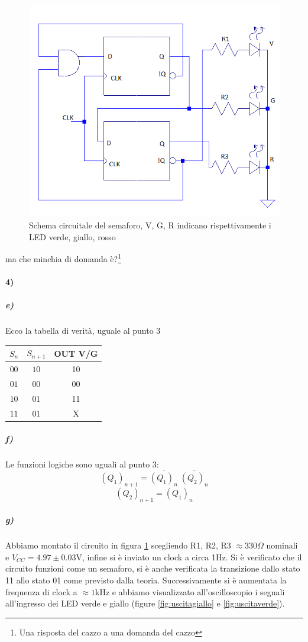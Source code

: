 \documentclass{article}
\begin{document}
		\begin{figure}
			\centering
			\includegraphics[width=0.7\linewidth]{foto/circuito}
			\caption{Schema circuitale del semaforo, V, G, R indicano rispettivamente i LED verde, giallo, rosso}
			\label{fig:circuito}
		\end{figure}
				
		ma che minchia di domanda è?\footnote{Una risposta del cazzo a una domanda del cazzo}

\paragraph{4)}
	\subparagraph{e)}
		Ecco la tabella di verità, uguale al punto 3
	\begin{center}
		\begin{tabular}{ccc}
			\hline
			$S_n$ & $S_{n+1}$ &OUT V/G\\
			\hline
			$00$ & $10$ & 10\\
			$01$ & $00$ & 00\\
			$10$ & $01$ & 11\\
			$11$ & $01$ & X\\
			\hline
		\end{tabular}
	\end{center}
	
	\subparagraph{f)}
		Le funzioni logiche sono uguali al punto 3:
		\[
		(Q_1)_{n+1}=\overline{(Q_1)_n} \; \overline{(Q_2)_n}
		\]
		\[
		(Q_2)_{n+1}=(Q_1)_n
		\]
	\subparagraph{g)}
		Abbiamo montato il circuito in figura \ref{fig:circuito} scegliendo R1, R2, R3 $\approx 330 \Omega$ nominali e $V_{CC}=4.97\pm0.03$V, infine si è inviato un clock a circa 1Hz. Si è verificato che il circuito funzioni come un semaforo, si è anche verificata la transizione dallo stato 11 allo stato 01 come previsto dalla teoria. Successivamente si è aumentata la frequenza di clock a $\approx1$kHz e abbiamo visualizzato all'oscilloscopio i segnali all'ingresso dei LED verde e giallo (figure \ref{fig:uscitagiallo} e \ref{fig:uscitaverde}).
		
\end{document}
